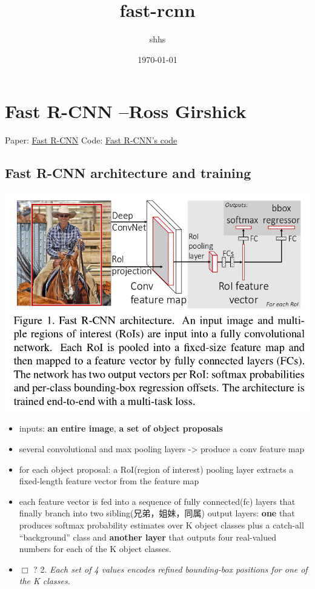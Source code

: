 \documentclass[11pt]{article}
\title{fast-rcnn}
\author{shhs}
\date{\today}
\begin{document}
\maketitle

\setcounter{tocdepth}{3}
\tableofcontents
\vspace*{1cm}

\section{Fast R-CNN --Ross Girshick}
\label{sec-1}

 
Paper: \href{http://arxiv.org/abs/1504.08083}{Fast R-CNN}
Code: \href{https://github.com/rbgirshick/fast-rcnn}{Fast R-CNN's code}
\subsection{Fast R-CNN architecture and training}
\label{sec-1-1}


   \includegraphics[width=.9\linewidth]{./pic_fast_rcnn/1.png}
\begin{itemize}
\item inputs: \textbf{an entire image}, \textbf{a set of object proposals}
\item several convolutional and max pooling layers -> produce a conv feature map
\item for each object proposal: a RoI(region of interest) pooling layer extracts a 
     fixed-length feature vector from the feature map
\item each feature vector is fed into a sequence of fully connected(fc) layers 
     that finally branch into two sibling(兄弟，姐妹，同属) output layers:
     \textbf{one} that produces softmax probability estimates over K object classes
     plus a catch-all ``background'' class and \textbf{another layer} that outputs 
     four real-valued numbers for each of the K object classes.
\item $\Box$ ? 2. \emph{Each set of 4 values encodes refined bounding-box positions for one of            the K classes.}
\end{itemize}
\end{document}

